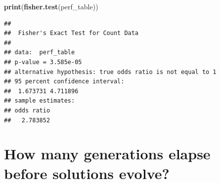 \documentclass[
]{book}
\newenvironment{Shaded}{\begin{snugshade}}{\end{snugshade}}
\newcommand{\KeywordTok}[1]{\textcolor[rgb]{0.13,0.29,0.53}{\textbf{#1}}}
\newcommand{\NormalTok}[1]{#1}
\begin{document}
\begin{Shaded}
\begin{Highlighting}[]
\KeywordTok{print}\NormalTok{(}\KeywordTok{fisher.test}\NormalTok{(perf\_table))}
\end{Highlighting}
\end{Shaded}

\begin{verbatim}
## 
##  Fisher's Exact Test for Count Data
## 
## data:  perf_table
## p-value = 3.585e-05
## alternative hypothesis: true odds ratio is not equal to 1
## 95 percent confidence interval:
##  1.673731 4.711896
## sample estimates:
## odds ratio 
##   2.783852
\end{verbatim}

\hypertarget{how-many-generations-elapse-before-solutions-evolve-2}{%
\section{How many generations elapse before solutions evolve?}\label{how-many-generations-elapse-before-solutions-evolve-2}}
\end{document}
